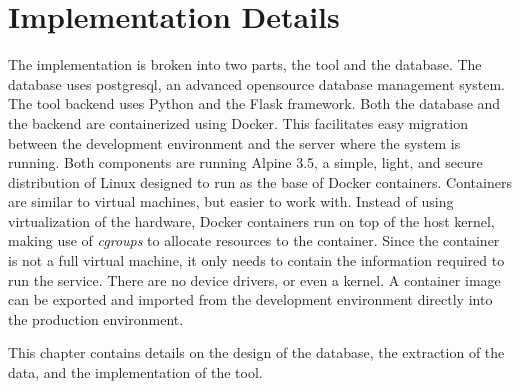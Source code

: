 \chapter{Implementation Details}

The implementation is broken into two parts, the tool and the database.
The database uses postgresql, an advanced opensource database management
system. The tool backend uses Python and the Flask framework.
Both the database and the \tool{} backend are containerized using
Docker. This facilitates easy migration between the development
environment and the server where the system is running. Both components
are running Alpine 3.5, a simple, light, and secure distribution of
Linux designed to run as the base of Docker containers. Containers are
similar to virtual machines, but easier to work with. Instead of using
virtualization of the hardware, Docker containers run on top of the host
kernel, making use of \textit{cgroups} to allocate resources to the
container. Since the container is not a full virtual machine, it only
needs to contain the information required to run the service. There are
no device drivers, or even a kernel. A container image can be exported
and imported from the development environment directly into the
production environment.

This chapter contains details on the design of the database, the
extraction of the data, and the implementation of the tool.
